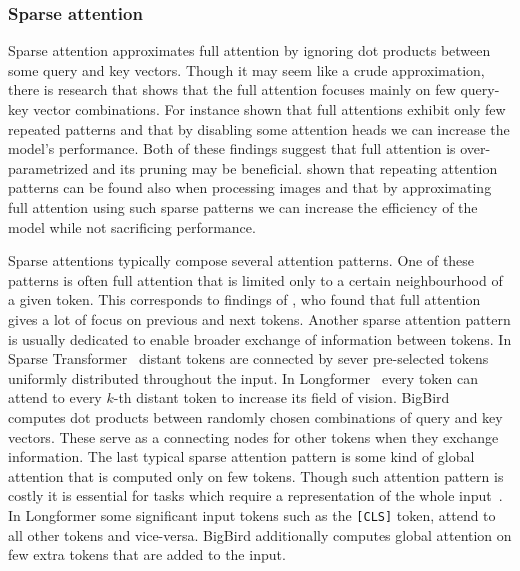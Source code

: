 \subsubsection{Sparse attention}


Sparse attention approximates full attention by ignoring dot products between
some query and key vectors. Though it may seem like a crude approximation, there
is research that shows that the full attention focuses mainly on few query-key
vector combinations. For instance \cite{kovaleva2019revealing} shown that full
attentions exhibit only few repeated patterns and that by disabling some
attention heads we can increase the model's performance. Both of these findings
suggest that full attention is over-parametrized and its pruning may be
beneficial. \cite{child2019generating} shown that repeating attention patterns
can be found also when processing images and that by approximating full
attention using such sparse patterns we can increase the efficiency of the model
while not sacrificing performance.

Sparse attentions typically compose several attention patterns. One of these
patterns is often full attention that is limited only to a certain neighbourhood
of a given token. This corresponds to findings of \cite{clark2019does}, who
found that full attention gives a lot of focus on previous and next tokens.
Another sparse attention pattern is usually dedicated to enable broader exchange
of information between tokens. In Sparse Transformer~\cite{child2019generating}
distant tokens are connected by sever pre-selected tokens uniformly distributed
throughout the input. In Longformer~\cite{beltagy2020longformer} every token can
attend to every $k$-th distant token to increase its field of vision.
BigBird~\cite{zaheer2020big} computes dot products between randomly chosen
combinations of query and key vectors. These serve as a connecting nodes for
other tokens when they exchange information. The last typical sparse attention
pattern is some kind of global attention that is computed only on few tokens.
Though such attention pattern is costly it is essential for tasks which require
a representation of the whole input~\cite{beltagy2020longformer}. In Longformer
some significant input tokens such as the \texttt{[CLS]} token, attend to all
other tokens and vice-versa. BigBird additionally computes global attention on
few extra tokens that are added to the input.

